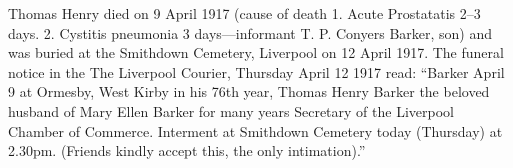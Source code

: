 Thomas Henry died on 9 April 1917\cite{THBdeathcert} (cause of death 1. Acute Prostatatis 2--3 days. 2. Cystitis pneumonia 3 days---informant T. P. Conyers Barker, son) and was buried at the Smithdown Cemetery, Liverpool on 12 April 1917.\cite{ToxtethBarker20} The funeral notice in the The Liverpool Courier, Thursday April 12 1917 read:
``Barker April 9 at Ormesby, West Kirby in his 76th year, Thomas Henry Barker the beloved husband of Mary Ellen Barker for many years Secretary of the Liverpool Chamber of Commerce. Interment at Smithdown Cemetery today (Thursday) at 2.30pm. (Friends kindly accept this, the only intimation).''
